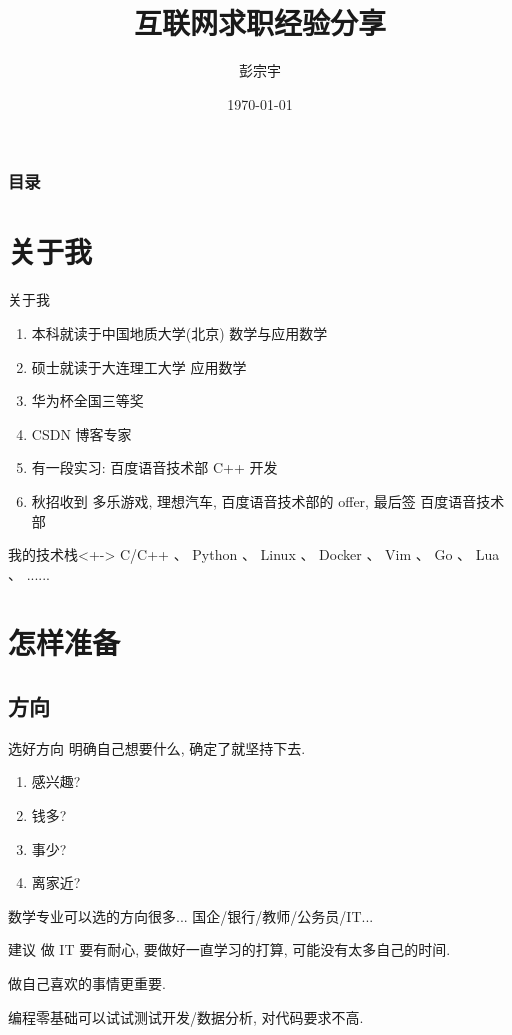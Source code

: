 \documentclass{ctexbeamer}
\title[互联网求职经验分享]{互联网求职经验分享}
\author[彭宗宇]{彭宗宇}
\institute[DLUT]{%
	大连理工大学
}
\date{\today}
\begin{document}
\maketitle

\begin{frame}
	\frametitle{\textbf{目录}}
	\tableofcontents
\end{frame}


\section{关于我}
\begin{frame}{关于我}
	\begin{enumerate}[<+-| alert@+>]
		\item 本科就读于中国地质大学(北京) 数学与应用数学
		\item 硕士就读于大连理工大学  应用数学
		\item 华为杯全国三等奖
		\item CSDN 博客专家
		\item 有一段实习: 百度语音技术部 C++ 开发
		\item 秋招收到 多乐游戏, 理想汽车, 百度语音技术部的 offer,  最后签 百度语音技术部
	\end{enumerate}

	\begin{block}{我的技术栈}<+->
		C/C++ 、 Python 、 Linux 、 Docker 、 Vim 、 Go 、 Lua 、 ......
	\end{block}
\end{frame}




\section{怎样准备}


\subsection{方向}
\begin{frame}{选好方向}
	明确自己想要什么, 确定了就坚持下去.
	\begin{enumerate}
		\item 感兴趣?
		\item 钱多?
		\item 事少?
		\item 离家近?
	\end{enumerate}

	数学专业可以选的方向很多... 国企/银行/教师/公务员/IT...

	\begin{exampleblock}{建议}
		做 IT 要有耐心, 要做好一直学习的打算,
		可能没有太多自己的时间.

		做自己喜欢的事情更重要.

		编程零基础可以试试测试开发/数据分析, 对代码要求不高.
	\end{exampleblock}
\end{frame}
\end{document}
